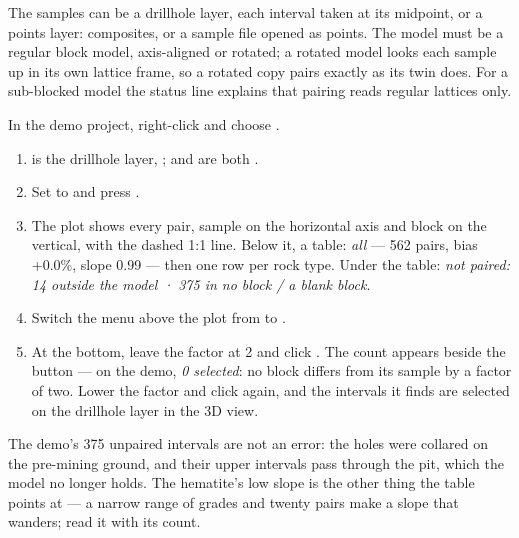 The samples can be a drillhole layer, each interval taken at its midpoint, or a points layer: composites, or a sample file opened as points. The model must be a regular block model, axis-aligned or rotated; a rotated model looks each sample up in its own lattice frame, so a rotated copy pairs exactly as its twin does. For a sub-blocked model the status line explains that pairing reads regular lattices only.

\begin{tryit}
In the demo project, right-click  and choose .
\begin{enumerate}
\item {} is the drillhole layer, ;  and  are both .
\item Set  to  and press .
\item The plot shows every pair, sample on the horizontal axis and block on the vertical, with the dashed 1:1 line. Below it, a table: \emph{all} — 562 pairs, bias +0.0\%, slope 0.99 — then one row per rock type. Under the table: \emph{not paired: 14 outside the model · 375 in no block / a blank block}.
\item Switch the menu above the plot from  to .
\item At the bottom, leave the factor at 2 and click . The count appears beside the button — on the demo, \emph{0 selected}: no block differs from its sample by a factor of two. Lower the factor and click again, and the intervals it finds are selected on the drillhole layer in the 3D view.
\end{enumerate}
\end{tryit}


The demo's 375 unpaired intervals are not an error: the holes were collared on the pre-mining ground, and their upper intervals pass through the pit, which the model no longer holds. The hematite's low slope is the other thing the table points at — a narrow range of grades and twenty pairs make a slope that wanders; read it with its  count.

